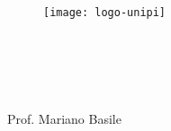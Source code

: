 
\begin{titlepage}

\begin{center}

\begin{LARGE}
\textbf{\myUni}\\
\end{LARGE}

\vspace{10pt}

\begin{Large}
\textsc{\myDepartment}\\
\end{Large}

\vspace{10pt}

\begin{large}
\textsc{\myFaculty}\\
\end{large}

\vspace{25pt}
\begin{figure}[htbp]
\begin{center}
\texttt{[image: logo-unipi]}
\end{center}
\end{figure}
\vspace{30pt} 

\begin{LARGE}
\begin{center}
\textbf{\myTitle}\\
\end{center}
\end{LARGE}

\vspace{10pt} 

\begin{large}
\textsl{\myDegree}\\
\end{large}

\vspace{35pt} 

\begin{large}
\begin{flushleft}
\vspace{5pt} 
\profTitle{} \myProf{} \\
\vspace{5pt}
\vspace{5pt}
Prof. Mariano Basile
\end{flushleft}


\end{large}
\end{center}
\end{titlepage}
